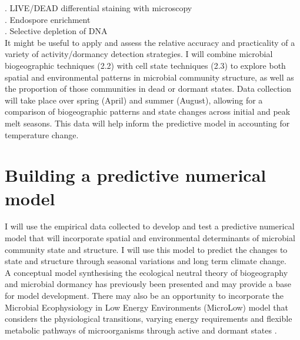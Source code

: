 . LIVE/DEAD differential staining with microscopy\\
. Endospore enrichment\\
. Selective depletion of DNA\\

\noindent It might be useful to apply and assess the relative accuracy and practicality of a variety of activity/dormancy detection strategies. I will combine microbial biogeographic techniques (2.2) with cell state techniques (2.3) to explore both spatial and environmental patterns in microbial community structure, as well as the proportion of those communities in dead or dormant states. Data collection will take place over spring (April) and summer (August), allowing for a comparison of biogeographic patterns and state changes across initial and peak melt seasons. This data will help inform the predictive model in accounting for temperature change.

\section{Building a predictive numerical model}

I will use the empirical data collected to develop and test a predictive numerical model that will incorporate spatial and environmental determinants of microbial community state and structure. I will use this model to predict the changes to state and structure through seasonal variations and long term climate change. \\

\noindent A conceptual model synthesising the ecological neutral theory of biogeography and microbial dormancy has previously been presented \cite{locey2010synthesizing} and may provide a base for model development. There may also be an opportunity to incorporate the Microbial Ecophysiology in Low Energy Environments (MicroLow) model that considers the physiological transitions, varying energy requirements and flexible metabolic pathways of microorganisms through active and dormant states \cite{bradley2019survival}.  

  



